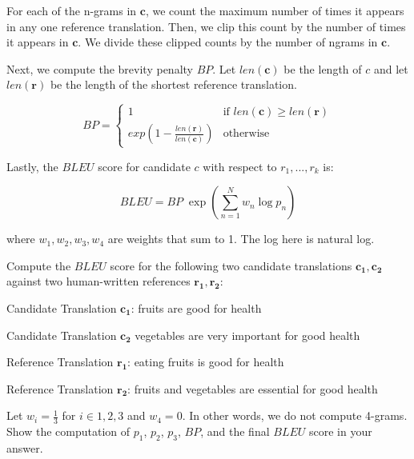 \documentclass[12pt, letterpaper]{article}
\begin{document}
\begin{enumerate}
    For each of the n-grams in $\mathbf{c}$, we count the maximum number of times it appears in any one reference translation. Then, we clip this count by the number of times it appears in $\mathbf{c}$. We divide these clipped counts by the number of ngrams in $\mathbf{c}$.
    
    Next, we compute the brevity penalty $BP$. Let $len(\mathbf{c})$ be the length of $c$ and let $len(\mathbf{r})$ be the length of the shortest reference translation.
    
    \begin{equation*}
    BP =  
    \begin{cases}
        1 & \text{if } len(\mathbf{c}) \geq len(\mathbf{r})\\
        exp(1 - \frac{len(\mathbf{r})}{len(\mathbf{c})}) & \text{otherwise}
    \end{cases}
    \end{equation*}

    Lastly, the $BLEU$ score for candidate $c$ with respect to $r_1, . . . , r_k$ is:
    
    \begin{equation}
        BLEU = BP\;\exp(\sum_{n=1}^{N} w_n \log p_n)
    \end{equation}

    where $w_1 , w_2 , w_3 , w_4$ are weights that sum to 1. The log here is natural log.
    

    Compute the $BLEU$ score for the following two candidate translations $\mathbf{c_1}, \mathbf{c_2}$ against two human-written references $\mathbf{r_1}, \mathbf{r_2}$:
    
    \begin{description}
            \item Candidate Translation $\mathbf{c_1}$: fruits are good for health
            \item Candidate Translation $\mathbf{c_2}$ vegetables are very important for good health
            \item Reference Translation $\mathbf{r_1}$: eating fruits is good for health
            \item Reference Translation $\mathbf{r_2}$: fruits and vegetables are essential for good health
    \end{description}
        
    Let $w_i = \frac{1}{3}$ for $i \in {1,2,3}$ and $w_4 = 0$. In other words, we do not compute 4-grams. Show the computation of $p_1$, $p_2$, $p_3$, $BP$, and the final $BLEU$ score in your answer.

\end{enumerate}
\end{document}
